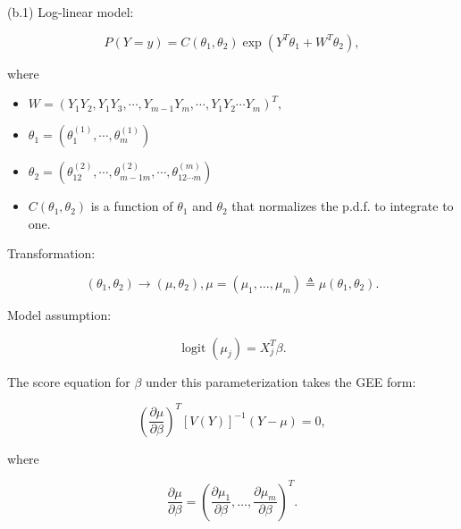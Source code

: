 \documentclass[UTF8,a4paper,10pt]{article}
\begin{document}






\pagebreak

\begin{Problem}[]{}
  (b.1) Log-linear model: 
  
  \[P(Y=y)=C\left(\theta_1, \theta_2\right) \exp \left(Y^T \theta_1+W^T \theta_2\right),\] 
  
  where 

  \begin{itemize}
    \item \(W=\left(Y_1 Y_2, Y_1 Y_3, \cdots, Y_{m-1} Y_m, \cdots, Y_1 Y_2 \cdots Y_m\right)^T, \)
    \item \(\theta_1=\left(\theta_1^{(1)}, \cdots, \theta_m^{(1)}\right)\)
    \item \(\theta_2=\left(\theta_{12}^{(2)}, \cdots, \theta_{m-1 m}^{(2)}, \cdots, \theta_{12 \cdots m}^{(m)}\right)\)
    \item \(C(\theta_1, \theta_2)\) is a function of \(\theta_1\) and \(\theta_2\) that normalizes the p.d.f. to integrate to one.

  \end{itemize}


Transformation: 

\[\left(\theta_1, \theta_2\right) \rightarrow\left(\mu, \theta_2\right), \mu=\left(\mu_1, \ldots, \mu_m\right) \triangleq \mu\left(\theta_1, \theta_2\right).\]

Model assumption: 

\[\operatorname{logit}\left(\mu_j\right)=X_j^T \beta.\]

The score equation for $\beta$ under this parameterization takes the GEE form:


\[\left(\frac{\partial \mu}{\partial \beta}\right)^T[V(Y)]^{-1}(Y-\mu)=0,\] 

where  

\[\frac{\partial \mu}{\partial \beta}=\left(\frac{\partial \mu_1}{\partial \beta}, \ldots, \frac{\partial \mu_m}{\partial \beta}\right)^T.\]



\end{Problem}
\end{document}
